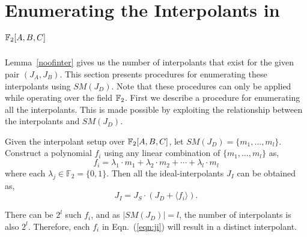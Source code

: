\section{Enumerating the Interpolants in ${\mathbb{F}}_2[A,B,C]$}
\label{sec:alg}
Lemma~\ref{noofinter} gives us the number of interpolants that exist for the given pair 
$(J_A,J_B)$. This section presents procedures for
enumerating these interpolants using $SM(J_D)$. 
Note that these procedures can only be applied while operating over 
the field ${\mathbb{F}}_2$. First we describe a procedure for enumerating all the interpolants.
This is made possible by exploiting the relationship between 
the interpolants and $SM(J_D)$.
\begin{Theorem}
\label{thm:enum_all}
Given the interpolant setup over ${\mathbb{F}}_2[A,B,C]$, let $SM(J_D) =\{m_1,\dots,m_l\}$. 
Construct a polynomial $f_i$ 
using any linear combination of $\{m_1,\dots,m_l\}$ as, 
\begin{equation}
\label{eqn:fi}
f_i = \lambda_1\cdot m_1 + \lambda_2\cdot m_2 +\cdots+ \lambda_l\cdot m_l
\end{equation} 
where each $\lambda_j \in \mathbb{F}_2 =  \{0,1\}$.
Then all the ideal-interpolants $J_I$ can be obtained as,
\begin{equation}
\label{eqn:ji}
J_I = J_S\cdot(J_D + \langle f_i \rangle).
\end{equation}
\end{Theorem}
There can be $2^l$ such $f_i$, and as $|SM(J_D)| = l$, the number of interpolants
is also $2^l$. Therefore, each $f_i$ in Eqn.~(\ref{eqn:ji}) will result in a distinct interpolant.

